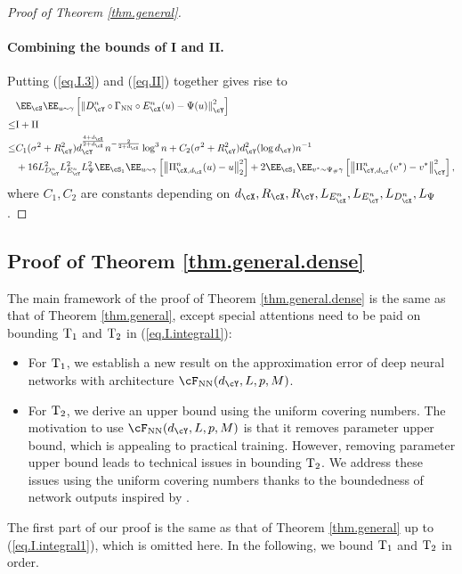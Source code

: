 \documentclass[11pt]{article} %
\begin{document}
\begin{proof}[Proof of Theorem \ref{thm.general}]
\paragraph{Combining the bounds of I and II.}
Putting (\ref{eq.I.3}) and (\ref{eq.II})  together gives rise to
\begin{align}
	&\EE_{\cS}\EE_{u\sim \gamma}\left[\left\|D_{\cY}^n\circ \Gamma_{\rm NN} \circ E_{\cX}^n(u)- \Psi(u)\right\|_{\cY}^2\right] \nonumber\\
	\leq & {\rm I}+{\rm II}\nonumber\\
	\leq &C_1(\sigma^2+R_{\cY}^2)d_{\cY}^{\frac{4+d_{\cX}}{2+d_{\cX}}}n^{-\frac{2}{2+d_{\cX}}}\log^3 n +C_2(\sigma^2+R_{\cY}^2)d_{\cY}^2(\log d_{\cY})n^{-1}\nonumber \\
	& + 16L_{D^n_{\cY}}^2L_{E^n_{\cY}}^2L_{\Psi}^2\EE_{\cS_1}\EE_{u\sim \gamma}\left[\left\| \Pi_{\cX,d_{\cX}}^n(u)- u\right\|_{2}^2\right]+2\EE_{\cS_1}\EE_{v^*\sim \Psi_{\#}\gamma}\left[ \left\|\Pi_{\cY,d_{\cY}}^n(v^*)- v^*\right\|_{\cY}^2\right],
	\label{eq.error.general.1}
\end{align}
where $C_1,C_2$ are constants depending on  $d_{\cX},R_{\cX},R_{\cY},L_{E^n_{\cX}},L_{E^n_{\cY}},L_{D^n_{\cX}},L_{\Psi}$.

\end{proof}

\subsection{Proof of Theorem \ref{thm.general.dense}} \label{thm.general.dense.proof}
The main framework of the proof of Theorem \ref{thm.general.dense} is the same as that of Theorem \ref{thm.general}, except special attentions need to be paid on bounding ${\rm T_1}$ and ${\rm T_2}$ in (\ref{eq.I.integral1}):
\begin{itemize}
	\item For ${\rm T_1}$, we establish a new result on the approximation error of deep neural networks with architecture $\cF_{\rm NN}(d_{\cY},L,p,M)$.
	\item For ${\rm T_2}$, we derive an upper bound using the uniform covering numbers. The motivation to use $\cF_{\rm NN}(d_{\cY}, L, p, M)$ is that it removes parameter upper bound, which is appealing to practical training. However, removing parameter upper bound leads to technical issues in bounding ${\rm T_2}$. We address these issues using the uniform covering numbers thanks to the boundedness of network outputs inspired by \citep{Jiao2021DeepNR}.
\end{itemize}   The first part of our proof is the same as that of Theorem \ref{thm.general} up to (\ref{eq.I.integral1}), which is omitted here. In the following, we bound ${\rm T_1}$ and ${\rm T_2}$ in order.
\end{document}
